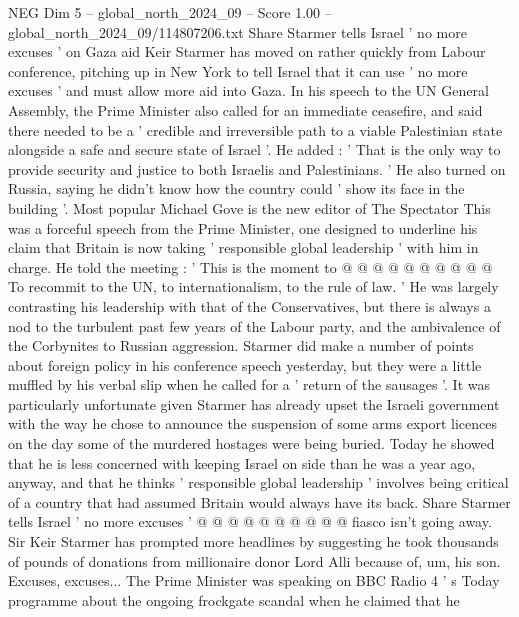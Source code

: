 \begin{textsample}{NEG Dim 5 – global\_north\_2024\_09 – Score 1.00 – global\_north\_2024\_09/114807206.txt}  \label{ex:f5_neg_100}
Share Starmer tells Israel ' no more excuses ' on Gaza aid Keir Starmer has moved on rather quickly from Labour conference, pitching up in New York to tell Israel that it can use ' no more excuses ' and must allow more aid into Gaza.
In his speech to the UN General Assembly, the Prime Minister also called for an immediate ceasefire, and said there needed to be a ' credible and irreversible path to a viable Palestinian state alongside a safe and secure state of Israel '.
He added : ' That is the only way to provide security and justice to both Israelis and Palestinians. ' He also turned on Russia, saying he didn't know how the country could ' show its face in the building '.
Most popular Michael Gove is the new editor of The Spectator This was a forceful speech from the Prime Minister, one designed to underline his claim that Britain is now taking ' responsible global leadership ' with him in charge.
He told the meeting : ' This is the moment to @ @ @ @ @ @ @ @ @ @ To recommit to the UN, to internationalism, to the rule of law. ' He was largely contrasting his leadership with that of the Conservatives, but there is always a nod to the turbulent past few years of the Labour party, and the ambivalence of the Corbynites to Russian aggression.
Starmer did make a number of points about foreign policy in his conference speech yesterday, but they were a little muffled by his verbal slip when he called for a ' return of the sausages '.
It was particularly unfortunate given Starmer has already upset the Israeli government with the way he chose to announce the suspension of some arms export licences on the day some of the murdered hostages were being buried.
Today he showed that he is less concerned with keeping Israel on side than he was a year ago, anyway, and that he thinks ' responsible global leadership ' involves being critical of a country that had assumed Britain would always have its back.
Share Starmer tells Israel ' no more excuses ' @ @ @ @ @ @ @ @ @ @ fiasco isn't going away.
Sir Keir Starmer has prompted more headlines by suggesting he took thousands of pounds of donations from millionaire donor Lord Alli because of, um, his son.
Excuses, excuses...
The Prime Minister was speaking on BBC Radio 4 ' s Today programme about the ongoing frockgate scandal when he claimed that he

\end{textsample}
